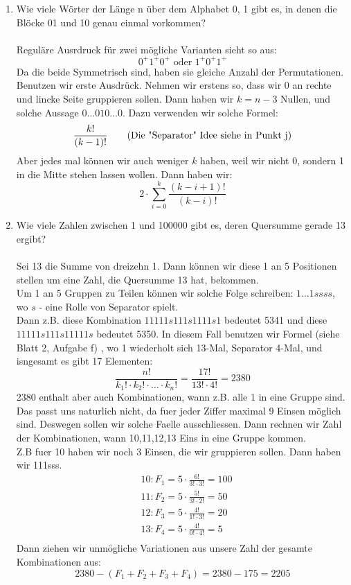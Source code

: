 \begin{enumerate}[label=(\alph*)]
        \item Wie viele Wörter der Länge n über dem Alphabet {0, 1} gibt es, in 
        denen die Blöcke 01 und 10 genau einmal vorkommen?\\\\
        Regul\"are Ausrdruck f\"ur zwei m\"ogliche Varianten sieht so aus:\\
        \[ 0^+1^+0^+\textrm{ oder } 1^+0^+1^+ \]
        Da die beide Symmetrisch sind, haben sie gleiche Anzahl der Permutationen.
        Benutzen wir erste Ausdr\"uck. Nehmen wir erstens so, dass wir 0 an rechte 
        und lincke Seite gruppieren sollen. Dann haben wir $k=n-3$ Nullen, und 
        solche Aussage $0\ldots010\ldots0$. Dazu verwenden wir solche Formel:
        \[\frac{k!}{(k-1)!} \textrm{\qquad(Die "Separator" Idee siehe in Punkt j)}\]
        Aber jedes mal k\"onnen wir auch weniger $k$ haben, weil wir nicht 0,
        sondern 1 in die Mitte stehen lassen wollen. Dann haben wir: 
        \[2\cdot\sum_{i=0}^k \frac{(k-i+1)!}{(k-i)!}\] 

        \item Wie viele Zahlen zwischen 1 und 100000 gibt es, deren Quersumme gerade 13 ergibt?\\\\
        Sei 13 die Summe von dreizehn 1. Dann k\"onnen wir diese 1 an 5 Positionen 
        stellen um eine Zahl, die Quersumme 13 hat, bekommen.\\
        Um 1 an 5 Gruppen zu Teilen k\"onnen wir solche Folge schreiben:
        $1...1 s s s s$, wo $s$ - eine Rolle von Separator spielt.\\ Dann z.B. diese
        Kombination $11111s111s1111s1$ bedeutet 5341 und diese $11111s111s11111s$
        bedeutet 5350. In diesem Fall benutzen wir Formel (siehe Blatt 2, Aufgabe f)
        , wo 1 wiederholt sich 13-Mal, Separator 4-Mal, und isngesamt es gibt 17 Elementen:
        \[\frac{n!}{k_1!\cdot k_2!\cdot\ldots\cdot k_n!} = \frac{17!}{13!\cdot4!} = 2380\]
        2380 enthalt aber auch Kombinationen, wann z.B. alle 1 in eine Gruppe sind. 
        Das passt uns naturlich nicht, da fuer jeder Ziffer maximal 9 Einsen m\"oglich sind.
        Deswegen sollen wir solche Faelle ausschliessen. Dann rechnen wir Zahl der 
        Kombinationen, wann 10,11,12,13 Eins in eine Gruppe kommen. \\
        Z.B fuer 10 haben wir noch 3 Einsen, die wir gruppieren sollen. Dann haben wir 111sss.
        \begin{align*}
        	&10: F_1 = 5 \cdot \frac{6!}{3!\cdot3!} = 100\\
        	&11: F_2 = 5 \cdot \frac{5!}{3!\cdot2!} = 50\\
        	&12: F_3 = 5 \cdot \frac{4!}{1!\cdot3!} = 20\\
        	&13: F_4 = 5 \cdot \frac{4!}{0!\cdot4!} = 5\\
        \end{align*}
        Dann ziehen wir unm\"ogliche Variationen aus unsere Zahl der gesamte Kombinationen aus:
        \[2380 - (F_1+F_2+F_3+F_4) = 2380 - 175 = 2205\]
    \end{enumerate}
